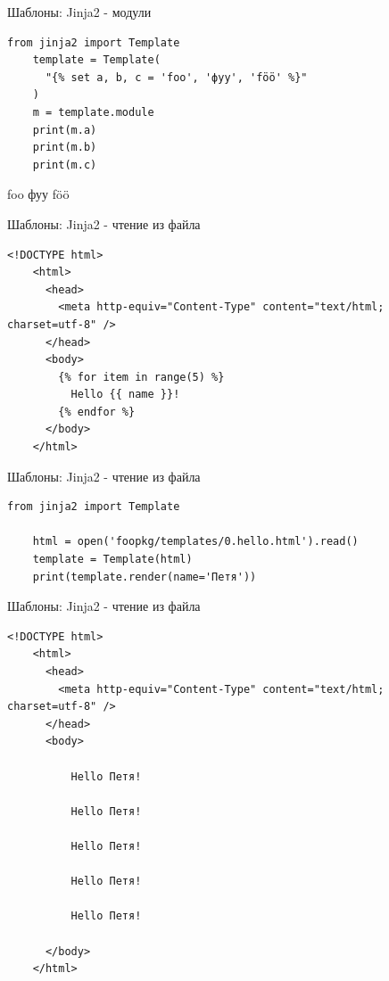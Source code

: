 \begin{frame}[fragile]{Шаблоны: Jinja2 - модули}

  \begin{lstlisting}[style=Python]
    from jinja2 import Template
    template = Template(
      "{% set a, b, c = 'foo', 'фуу', 'föö' %}"
    )
    m = template.module
    print(m.a)
    print(m.b)
    print(m.c)
  \end{lstlisting}

  foo\newline
  фуу\newline
  föö

\end{frame}

\begin{frame}[fragile]{Шаблоны: Jinja2 - чтение из файла}

  \begin{lstlisting}[style=html]
    <!DOCTYPE html>
    <html>
      <head>
        <meta http-equiv="Content-Type" content="text/html; charset=utf-8" />
      </head>
      <body>
        {% for item in range(5) %}
          Hello {{ name }}!
        {% endfor %}
      </body>
    </html>
  \end{lstlisting}

\end{frame}

\begin{frame}[fragile]{Шаблоны: Jinja2 - чтение из файла}

  \begin{lstlisting}[style=python]
    from jinja2 import Template

    html = open('foopkg/templates/0.hello.html').read()
    template = Template(html)
    print(template.render(name='Петя'))
  \end{lstlisting}

\end{frame}

\begin{frame}[fragile]{Шаблоны: Jinja2 - чтение из файла}

  \begin{lstlisting}[style=html]
    <!DOCTYPE html>
    <html>
      <head>
        <meta http-equiv="Content-Type" content="text/html; charset=utf-8" />
      </head>
      <body>

          Hello Петя!

          Hello Петя!

          Hello Петя!

          Hello Петя!

          Hello Петя!

      </body>
    </html>
  \end{lstlisting}

\end{frame}

